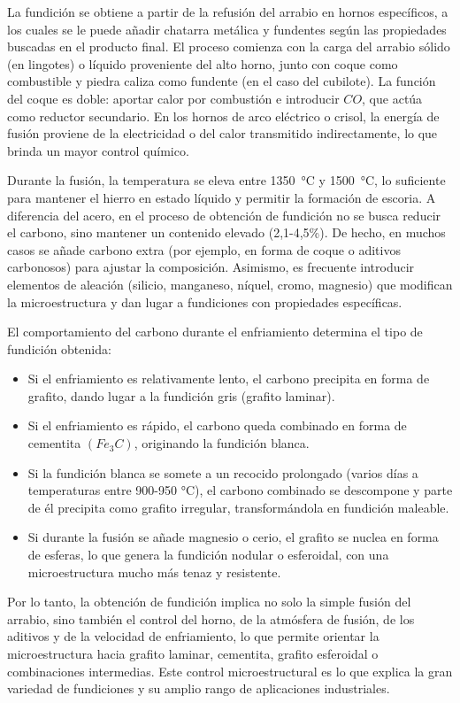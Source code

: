 \documentclass[12pt,a4paper]{article}
\begin{document}
La fundición se obtiene a partir de la refusión del arrabio en hornos específicos, a los cuales se le puede añadir chatarra metálica y fundentes según las propiedades buscadas en el producto final. El proceso comienza con la carga del arrabio sólido (en lingotes) o líquido proveniente del alto horno, junto con coque como combustible y piedra caliza como fundente (en el caso del cubilote). La función del coque es doble: aportar calor por combustión e introducir $CO$, que actúa como reductor secundario. En los hornos de arco eléctrico o crisol, la energía de fusión proviene de la electricidad o del calor transmitido indirectamente, lo que brinda un mayor control químico.

Durante la fusión, la temperatura se eleva entre \SI{1350}{\celsius} y \SI{1500}{\celsius}, lo suficiente para mantener el hierro en estado líquido y permitir la formación de escoria. A diferencia del acero, en el proceso de obtención de fundición no se busca reducir el carbono, sino mantener un contenido elevado (2,1-4,5\%). De hecho, en muchos casos se añade carbono extra (por ejemplo, en forma de coque o aditivos carbonosos) para ajustar la composición. Asimismo, es frecuente introducir elementos de aleación (silicio, manganeso, níquel, cromo, magnesio) que modifican la microestructura y dan lugar a fundiciones con propiedades específicas.

El comportamiento del carbono durante el enfriamiento determina el tipo de fundición obtenida:

\begin{itemize}
    \item Si el enfriamiento es relativamente lento, el carbono precipita en forma de grafito, dando lugar a la fundición gris (grafito laminar).
    \item Si el enfriamiento es rápido, el carbono queda combinado en forma de cementita $(Fe_3C)$, originando la fundición blanca.
    \item Si la fundición blanca se somete a un recocido prolongado (varios días a temperaturas entre 900-950 °C), el carbono combinado se descompone y parte de él precipita como grafito irregular, transformándola en fundición maleable.
    \item Si durante la fusión se añade magnesio o cerio, el grafito se nuclea en forma de esferas, lo que genera la fundición nodular o esferoidal, con una microestructura mucho más tenaz y resistente.
\end{itemize}

Por lo tanto, la obtención de fundición implica no solo la simple fusión del arrabio, sino también el control del horno, de la atmósfera de fusión, de los aditivos y de la velocidad de enfriamiento, lo que permite orientar la microestructura hacia grafito laminar, cementita, grafito esferoidal o combinaciones intermedias. Este control microestructural es lo que explica la gran variedad de fundiciones y su amplio rango de aplicaciones industriales.
\end{document}
